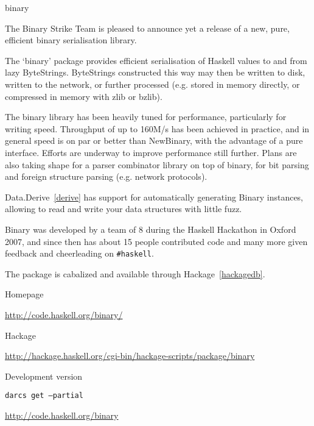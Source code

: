 \begin{hcarentry}{binary}
\label{binary}
\makeheader

The Binary Strike Team is pleased to announce yet a release of a new,
pure, efficient binary serialisation library.

The `binary' package provides efficient serialisation of Haskell values
to and from lazy ByteStrings. ByteStrings constructed this way may then
be written to disk, written to the network, or further processed (e.g.
stored in memory directly, or compressed in memory with zlib or bzlib).

The binary library has been heavily tuned for performance, particularly for
writing speed. Throughput of up to 160M/s has been achieved in practice, and
in general speed is on par or better than NewBinary, with the advantage of a
pure interface. Efforts are underway to improve performance still further.
Plans are also taking shape for a parser combinator library on top of
binary, for bit parsing and foreign structure parsing (e.g. network
protocols).

Data.Derive~\cref{derive} has support for automatically generating Binary
instances, allowing to read and write your data structures with little fuzz.

Binary was developed by a team of 8 during the Haskell Hackathon in Oxford
2007, and since then has about 15 people contributed code and many more
given feedback and cheerleading on \verb|#haskell|.

The package is cabalized and available through Hackage~\cref{hackagedb}.

\FurtherReading
\begin{compactitem}
\item Homepage

  \url{http://code.haskell.org/binary/}
\item Hackage

  \url{http://hackage.haskell.org/cgi-bin/hackage-scripts/package/binary}
\item Development version

  \texttt{darcs get --partial}

  \url{http://code.haskell.org/binary}
\end{compactitem}
\end{hcarentry}
